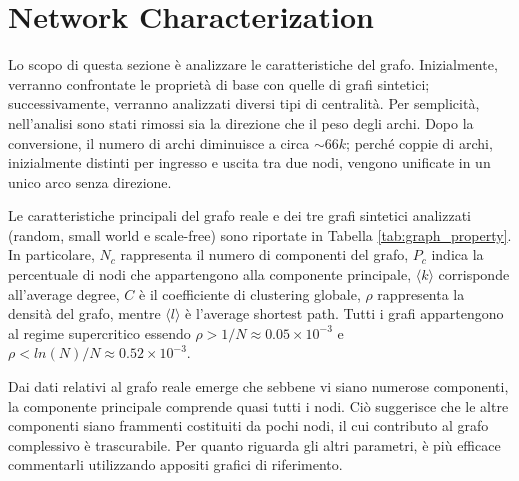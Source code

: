 \documentclass[sigchi]{acmart}
\begin{document}
\section{Network Characterization}\label{sec:network_characterization}
Lo scopo di questa sezione è analizzare le caratteristiche del grafo. Inizialmente, verranno confrontate le proprietà di base con quelle di grafi sintetici; successivamente, verranno analizzati diversi tipi di centralità. 
Per semplicità, nell'analisi sono stati rimossi sia la direzione che il peso degli archi. Dopo la conversione, il numero di archi diminuisce a circa $\sim 66k$; perché coppie di archi, inizialmente distinti per ingresso e uscita tra due nodi, vengono unificate in un unico arco senza direzione.

Le caratteristiche principali del grafo reale e dei tre grafi sintetici analizzati (random, small world e scale-free) sono riportate in Tabella \ref{tab:graph_property}. In particolare, $N_c$ rappresenta il numero di componenti del grafo, $P_c$ indica la percentuale di nodi che appartengono alla componente principale, $\langle k \rangle$ corrisponde all'average degree, $C$ è il coefficiente di clustering globale, $\rho$ rappresenta la densità del grafo, mentre $\langle l \rangle$ è l'average shortest path. Tutti i grafi appartengono al regime supercritico essendo $\rho > 1/N \approx 0.05 \times 10^{-3}$ e $\rho < ln(N)/N \approx 0.52 \times 10^{-3}$.

Dai dati relativi al grafo reale emerge che sebbene vi siano numerose componenti, la componente principale comprende quasi tutti i nodi. Ciò suggerisce che le altre componenti siano frammenti costituiti da pochi nodi, il cui contributo al grafo complessivo è trascurabile. Per quanto riguarda gli altri parametri, è più efficace commentarli utilizzando appositi grafici di riferimento.

\begin{table}[ht]
    \centering
    \caption{Confronto tra il grafo reale e tre grafi sintetici.}
    \label{tab:graph_property}
\end{table}
\end{document}
